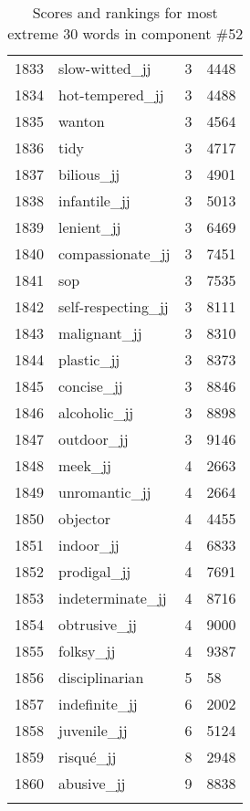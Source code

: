 \begin{longtable}[!htbp]{| rlr@{.}l |}
    1833 & slow-witted\_jj & 3 & 4448 \\
    1834 & hot-tempered\_jj & 3 & 4488 \\
    1835 & wanton & 3 & 4564 \\
    1836 & tidy & 3 & 4717 \\
    1837 & bilious\_jj & 3 & 4901 \\
    1838 & infantile\_jj & 3 & 5013 \\
    1839 & lenient\_jj & 3 & 6469 \\
    1840 & compassionate\_jj & 3 & 7451 \\
    1841 & sop & 3 & 7535 \\
    1842 & self-respecting\_jj & 3 & 8111 \\
    1843 & malignant\_jj & 3 & 8310 \\
    1844 & plastic\_jj & 3 & 8373 \\
    1845 & concise\_jj & 3 & 8846 \\
    1846 & alcoholic\_jj & 3 & 8898 \\
    1847 & outdoor\_jj & 3 & 9146 \\
    1848 & meek\_jj & 4 & 2663 \\
    1849 & unromantic\_jj & 4 & 2664 \\
    1850 & objector & 4 & 4455 \\
    1851 & indoor\_jj & 4 & 6833 \\
    1852 & prodigal\_jj & 4 & 7691 \\
    1853 & indeterminate\_jj & 4 & 8716 \\
    1854 & obtrusive\_jj & 4 & 9000 \\
    1855 & folksy\_jj & 4 & 9387 \\
    1856 & disciplinarian & 5 & 58 \\
    1857 & indefinite\_jj & 6 & 2002 \\
    1858 & juvenile\_jj & 6 & 5124 \\
    1859 & risqué\_jj & 8 & 2948 \\
    1860 & abusive\_jj & 9 & 8838 \\
    \hline
    \caption{Scores and rankings for most extreme 30 words in component \#52} \\
\end{longtable}
